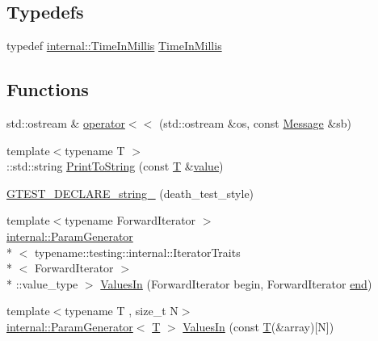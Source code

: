 \subsection*{Typedefs}
\begin{DoxyCompactItemize}
\item 
typedef \hyperlink{namespacetesting_1_1internal_a66a845df404b38fe85c5e14a069f255a}{internal\-::\-Time\-In\-Millis} \hyperlink{namespacetesting_a992de1d091ce660f451d1e8b3ce30fd6}{Time\-In\-Millis}
\end{DoxyCompactItemize}
\subsection*{Functions}
\begin{DoxyCompactItemize}
\item 
std\-::ostream \& \hyperlink{namespacetesting_a7b802e532fd68749765cb7dc156130db}{operator$<$$<$} (std\-::ostream \&os, const \hyperlink{classtesting_1_1Message}{Message} \&sb)
\item 
{\footnotesize template$<$typename T $>$ }\\\-::std\-::string \hyperlink{namespacetesting_aa5717bb1144edd1d262d310ba70c82ed}{Print\-To\-String} (const \hyperlink{calib3d_8hpp_a3efb9551a871ddd0463079a808916717}{T} \&\hyperlink{highgui__c_8h_ad4670c92695d4327c21292905a803901}{value})
\item 
\hyperlink{namespacetesting_a37b7e87f0a5f502c6918f37d1768c1f3}{G\-T\-E\-S\-T\-\_\-\-D\-E\-C\-L\-A\-R\-E\-\_\-string\-\_\-} (death\-\_\-test\-\_\-style)
\item 
{\footnotesize template$<$typename Forward\-Iterator $>$ }\\\hyperlink{classtesting_1_1internal_1_1ParamGenerator}{internal\-::\-Param\-Generator}\\*
$<$ typename\-::testing\-::internal\-::\-Iterator\-Traits\\*
$<$ Forward\-Iterator $>$\\*
\-::value\-\_\-type $>$ \hyperlink{namespacetesting_a5f8e1eb074d24671d679f6ccda6710bc}{Values\-In} (Forward\-Iterator begin, Forward\-Iterator \hyperlink{legacy_8hpp_ab21668ff869102944cbf3bb534bba27d}{end})
\item 
{\footnotesize template$<$typename T , size\-\_\-t N$>$ }\\\hyperlink{classtesting_1_1internal_1_1ParamGenerator}{internal\-::\-Param\-Generator}$<$ \hyperlink{calib3d_8hpp_a3efb9551a871ddd0463079a808916717}{T} $>$ \hyperlink{namespacetesting_affa90ba3821bd7ac15f147b1c31f9a73}{Values\-In} (const \hyperlink{calib3d_8hpp_a3efb9551a871ddd0463079a808916717}{T}(\&array)\mbox{[}N\mbox{]})

\end{DoxyCompactItemize}
